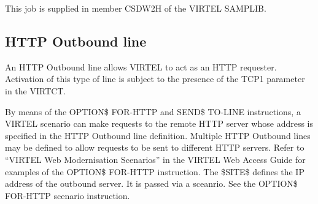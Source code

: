 \documentclass[letterpaper,10pt,english]{sphinxmanual}
\begin{document}
This job is supplied in member CSDW2H of the VIRTEL SAMPLIB.


\subsection{HTTP Outbound line}
\label{\detokenize{connectivity_guide:bookmark42}}\label{\detokenize{connectivity_guide:http-outbound-line}}
An HTTP Outbound line allows VIRTEL to act as an HTTP requester. Activation of this type of line is subject to the presence of the TCP1 parameter in the VIRTCT.

By means of the OPTION\$ FOR-HTTP and SEND\$ TO-LINE instructions, a VIRTEL scenario can make requests to the remote HTTP server whose address is specified in the HTTP Outbound line definition. Multiple HTTP Outbound lines may be defined to allow requests to be sent to different HTTP servers. Refer to “VIRTEL Web Modernisation Scenarios” in the VIRTEL Web Access Guide for examples of the OPTION\$ FOR-HTTP instruction. The \$SITE\$ defines the IP address of the outbound server. It is passed via a sceanrio. See the OPTION\$ FOR-HTTP scenario instruction.
\end{document}
